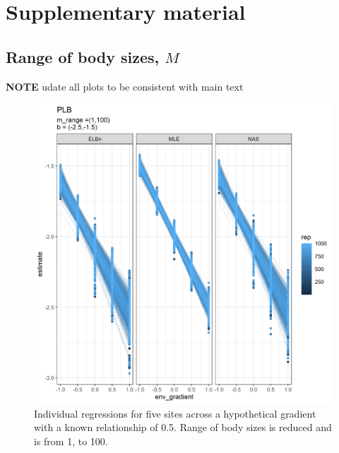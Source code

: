 \documentclass[
]{article}
\newcommand{\beginsupplement}{ \setcounter{table}{0} \renewcommand{\thetable}{S\arabic{table}} \setcounter{figure}{0} \renewcommand{\thefigure}{S\arabic{figure}}}
\begin{document}
\newpage

\hypertarget{supplementary-material}{%
\section*{Supplementary material}\label{supplementary-material}}

\beginsupplement

\hypertarget{range-of-body-sizes-m}{%
\subsection{\texorpdfstring{Range of body sizes,
\(M\)}{Range of body sizes, M}}\label{range-of-body-sizes-m}}

\textbf{NOTE} udate all plots to be consistent with main text

\begin{figure}
\centering
\includegraphics{figures/PLB_small_m_main.png}
\caption{Individual regressions for five sites across a hypothetical
gradient with a known relationship of 0.5. Range of body sizes is
reduced and is from 1, to 100.}
\end{figure}

\newpage
\end{document}
